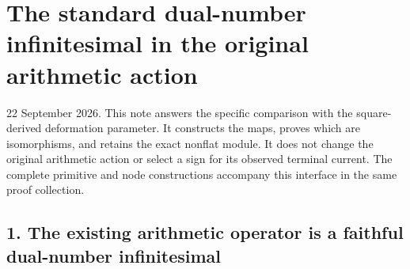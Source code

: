 \documentclass[
]{article}
\author{}
\date{}
\begin{document}
{
\setcounter{tocdepth}{3}
\tableofcontents
}
\section{The standard dual-number infinitesimal in the original
arithmetic
action}\label{the-standard-dual-number-infinitesimal-in-the-original-arithmetic-action}

22 September 2026. This note answers the specific comparison with the
square-derived deformation parameter. It constructs the maps, proves
which are isomorphisms, and retains the exact nonflat module. It does
not change the original arithmetic action or select a sign for its
observed terminal current. The complete primitive and node constructions
accompany this interface in the same proof collection.

\subsection{1. The existing arithmetic operator is a faithful
dual-number
infinitesimal}\label{the-existing-arithmetic-operator-is-a-faithful-dual-number-infinitesimal}
\end{document}
